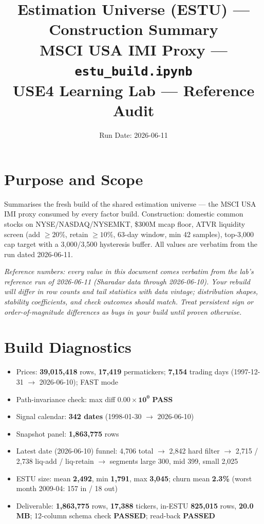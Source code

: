 \documentclass[11pt,a4paper]{article}
\title{\textbf{Estimation Universe (ESTU) --- Construction Summary}\\[2pt]
\large MSCI USA IMI Proxy --- \texttt{estu\_build.ipynb}\\[4pt]
\normalsize USE4 Learning Lab --- Reference Audit}
\author{Run Date: 2026-06-11}
\date{}
\newcommand{\PASS}[1]{\textcolor{pass}{\textbf{#1}}}
\newcommand{\NOTE}[1]{\textcolor{note}{\textit{#1}}}
\begin{document}
\maketitle
\tableofcontents
\newpage

\section{Purpose and Scope}

Summarises the fresh build of the shared estimation universe
 --- the MSCI USA IMI proxy consumed by
every factor build. Construction: domestic common stocks on NYSE/NASDAQ/NYSEMKT,
\$300M mcap floor, ATVR liquidity screen (add $\geq20\%$, retain $\geq10\%$,
63-day window, min 42 samples), top-3{,}000 cap target with a 3{,}000/3{,}500
hysteresis buffer. All values are verbatim from the run dated 2026-06-11.

\NOTE{Reference numbers: every value in this document comes verbatim from the lab's reference run of 2026-06-11 (Sharadar data through 2026-06-10). Your rebuild will differ in row counts and tail statistics with data vintage; distribution shapes, stability coefficients, and check outcomes should match. Treat persistent sign or order-of-magnitude differences as bugs in your build until proven otherwise.}


\section{Build Diagnostics}

\begin{itemize}[leftmargin=*,topsep=2pt,itemsep=2pt]
  \item Prices: \textbf{39{,}015{,}418} rows, \textbf{17{,}419} permatickers;
    \textbf{7{,}154} trading days (1997-12-31 $\to$ 2026-06-10); FAST mode
  \item Path-invariance check: max diff $\mathbf{0.00\times10^{0}}$ \PASS{PASS}
  \item Signal calendar: \textbf{342 dates} (1998-01-30 $\to$ 2026-06-10)
  \item Snapshot panel: \textbf{1{,}863{,}775} rows
  \item Latest date (2026-06-10) funnel: 4{,}706 total $\to$ 2{,}842 hard filter
    $\to$ 2{,}715 / 2{,}738 liq-add / liq-retain $\to$ segments
    large 300, mid 399, small 2{,}025
  \item ESTU size: mean \textbf{2{,}492}, min \textbf{1{,}791}, max \textbf{3{,}045};
    churn mean \textbf{2.3\%} (worst month 2009-04: 157 in / 18 out)
  \item Deliverable: \textbf{1{,}863{,}775} rows, \textbf{17{,}388} tickers,
    in-ESTU \textbf{825{,}015} rows, \textbf{20.0 MB}; 12-column schema check
    \PASS{PASSED}; read-back \PASS{PASSED}
\end{itemize}
\end{document}
